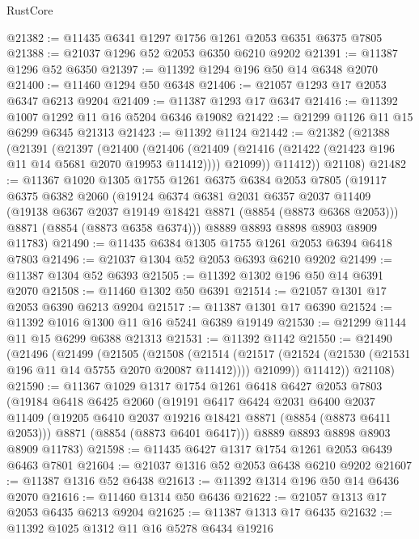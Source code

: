 \begin{lexlean}{RustCore}
\begin{coremodule}
@21382 := @11435 @6341 @1297 @1756 @1261 @2053 @6351 @6375 @7805
@21388 := @21037 @1296 @52 @2053 @6350 @6210 @9202
@21391 := @11387 @1296 @52 @6350
@21397 := @11392 @1294 @196 @50 @14 @6348 @2070
@21400 := @11460 @1294 @50 @6348
@21406 := @21057 @1293 @17 @2053 @6347 @6213 @9204
@21409 := @11387 @1293 @17 @6347
@21416 := @11392 @1007 @1292 @11 @16 @5204 @6346 @19082
@21422 := @21299 @1126 @11 @15 @6299 @6345 @21313
@21423 := @11392 @1124
@21442 := @21382
    (@21388
      (@21391
        (@21397
          (@21400
            (@21406
              (@21409 (@21416 (@21422 (@21423 @196 @11 @14 @5681 @2070 @19953 @11412))))
              @21099))
          @11412))
      @21108)
@21482 := @11367
    @1020
    @1305
    @1755
    @1261
    @6375
    @6384
    @2053
    @7805
    (@19117
      @6375
      @6382
      @2060
      (@19124
        @6374
        @6381
        @2031
        @6357
        @2037
        @11409
        (@19138 @6367 @2037 @19149 @18421 @8871 (@8854 (@8873 @6368 @2053)))
        @8871
        (@8854 (@8873 @6358 @6374)))
      @8889
      @8893
      @8898
      @8903
      @8909
      @11783)
@21490 := @11435 @6384 @1305 @1755 @1261 @2053 @6394 @6418 @7803
@21496 := @21037 @1304 @52 @2053 @6393 @6210 @9202
@21499 := @11387 @1304 @52 @6393
@21505 := @11392 @1302 @196 @50 @14 @6391 @2070
@21508 := @11460 @1302 @50 @6391
@21514 := @21057 @1301 @17 @2053 @6390 @6213 @9204
@21517 := @11387 @1301 @17 @6390
@21524 := @11392 @1016 @1300 @11 @16 @5241 @6389 @19149
@21530 := @21299 @1144 @11 @15 @6299 @6388 @21313
@21531 := @11392 @1142
@21550 := @21490
    (@21496
      (@21499
        (@21505
          (@21508
            (@21514
              (@21517 (@21524 (@21530 (@21531 @196 @11 @14 @5755 @2070 @20087 @11412))))
              @21099))
          @11412))
      @21108)
@21590 := @11367
    @1029
    @1317
    @1754
    @1261
    @6418
    @6427
    @2053
    @7803
    (@19184
      @6418
      @6425
      @2060
      (@19191
        @6417
        @6424
        @2031
        @6400
        @2037
        @11409
        (@19205 @6410 @2037 @19216 @18421 @8871 (@8854 (@8873 @6411 @2053)))
        @8871
        (@8854 (@8873 @6401 @6417)))
      @8889
      @8893
      @8898
      @8903
      @8909
      @11783)
@21598 := @11435 @6427 @1317 @1754 @1261 @2053 @6439 @6463 @7801
@21604 := @21037 @1316 @52 @2053 @6438 @6210 @9202
@21607 := @11387 @1316 @52 @6438
@21613 := @11392 @1314 @196 @50 @14 @6436 @2070
@21616 := @11460 @1314 @50 @6436
@21622 := @21057 @1313 @17 @2053 @6435 @6213 @9204
@21625 := @11387 @1313 @17 @6435
@21632 := @11392 @1025 @1312 @11 @16 @5278 @6434 @19216

\end{coremodule}
\end{lexlean}
